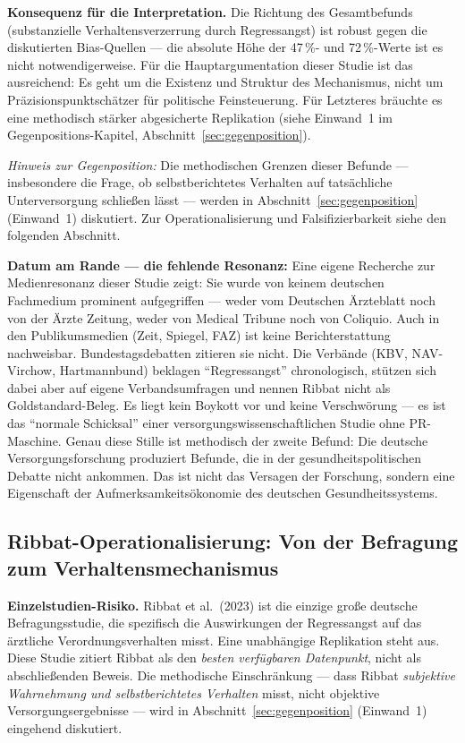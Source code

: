 \documentclass{umbruch-position}
\begin{document}
\noindent\textbf{Konsequenz für die Interpretation.} Die Richtung des Gesamtbefunds (substanzielle Verhaltens\-verzerrung durch Regress\-angst) ist robust gegen die diskutierten Bias-Quellen --- die absolute Höhe der 47\,\%- und 72\,\%-Werte ist es nicht notwendigerweise. Für die Hauptargumentation dieser Studie ist das ausreichend: Es geht um die Existenz und Struktur des Mechanismus, nicht um Präzisionspunktschätzer für politische Feinsteuerung. Für Letzteres bräuchte es eine methodisch stärker abgesicherte Replikation (siehe Einwand~1 im Gegenpositions-Kapitel, Abschnitt~\ref{sec:gegenposition}).

\medskip
\noindent\textit{Hinweis zur Gegenposition:} Die methodischen Grenzen dieser Befunde --- insbesondere die Frage, ob selbstberichtetes Verhalten auf tatsächliche Unterversorgung schließen lässt --- werden in Abschnitt~\ref{sec:gegenposition} (Einwand~1) diskutiert. Zur Operationalisierung und Falsifizierbarkeit siehe den folgenden Abschnitt.

\textbf{Datum am Rande --- die fehlende Resonanz:} Eine eigene Recherche zur Medienresonanz dieser Studie zeigt: Sie wurde von keinem deutschen Fachmedium prominent aufgegriffen --- weder vom Deutschen Ärzteblatt noch von der Ärzte Zeitung, weder von Medical Tribune noch von Coliquio. Auch in den Publikumsmedien (Zeit, Spiegel, FAZ) ist keine Berichterstattung nachweisbar. Bundestagsdebatten zitieren sie nicht. Die Verbände (KBV, NAV-Virchow, Hartmannbund) beklagen ``Regressangst'' chronologisch, stützen sich dabei aber auf eigene Verbandsumfragen und nennen Ribbat nicht als Goldstandard-Beleg. Es liegt kein Boykott vor und keine Verschwörung --- es ist das ``normale Schicksal'' einer versorgungswissenschaftlichen Studie ohne PR-Maschine. Genau diese Stille ist methodisch der zweite Befund: Die deutsche Versorgungsforschung produziert Befunde, die in der gesundheitspolitischen Debatte nicht ankommen. Das ist nicht das Versagen der Forschung, sondern eine Eigenschaft der Aufmerksamkeitsökonomie des deutschen Gesundheitssystems.

\subsection{Ribbat-Operationalisierung: Von der Befragung zum Verhaltensmechanismus}

\textbf{Einzelstudien-Risiko.} Ribbat et al.\ (2023) ist die einzige große deutsche Befragungsstudie, die spezifisch die Auswirkungen der Regressangst auf das ärztliche Verordnungsverhalten misst. Eine unabhängige Replikation steht aus. Diese Studie zitiert Ribbat als den \textit{besten verfügbaren Datenpunkt}, nicht als abschließenden Beweis. Die methodische Einschränkung --- dass Ribbat \textit{subjektive Wahrnehmung und selbstberichtetes Verhalten} misst, nicht objektive Versorgungsergebnisse --- wird in Abschnitt~\ref{sec:gegenposition} (Einwand~1) eingehend diskutiert.
\end{document}
